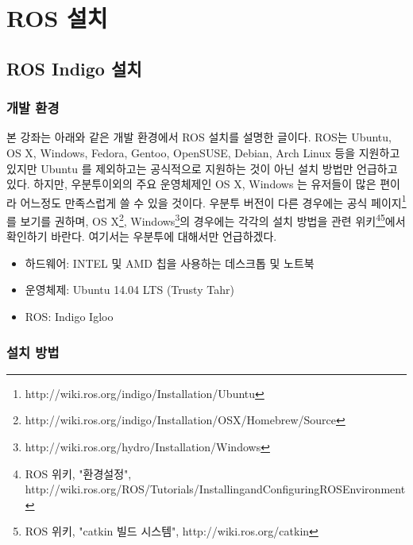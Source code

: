 
\chapter{ROS 설치}

\section{ROS Indigo 설치}

\subsection{개발 환경}

본 강좌는 아래와 같은 개발 환경에서 ROS 설치를 설명한 글이다. ROS는 Ubuntu, OS X, Windows, Fedora, Gentoo, OpenSUSE, Debian, Arch Linux 등을 지원하고 있지만 Ubuntu 를 제외하고는 공식적으로 지원하는 것이 아닌 설치 방법만 언급하고 있다. 하지만, 우분투이외의 주요 운영체제인 OS X, Windows 는 유저들이 많은 편이라 어느정도 만족스럽게 쓸 수 있을 것이다. 우분투 버전이 다른 경우에는 공식 페이지\footnote{http://wiki.ros.org/indigo/Installation/Ubuntu}를 보기를 권하며, OS X\footnote{http://wiki.ros.org/indigo/Installation/OSX/Homebrew/Source}, Windows\footnote{http://wiki.ros.org/hydro/Installation/Windows}의 경우에는 각각의 설치 방법을 관련 위키\footnote{ROS 위키, "환경설정", http://wiki.ros.org/ROS/Tutorials/InstallingandConfiguringROSEnvironment}\footnote{ROS 위키, "catkin 빌드 시스템", http://wiki.ros.org/catkin}에서 확인하기 바란다. 여기서는 우분투에 대해서만 언급하겠다.

\begin{itemize}
\item 하드웨어: INTEL 및 AMD 칩을 사용하는 데스크톱 및 노트북 
\item 운영체제: Ubuntu 14.04 LTS (Trusty Tahr)
\item ROS: Indigo Igloo
\end{itemize}

\subsection{설치 방법}

